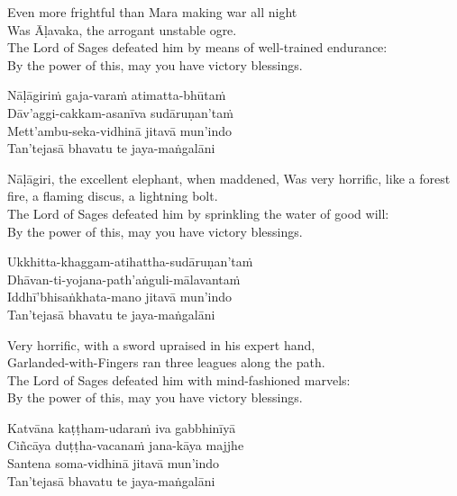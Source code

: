 \begin{english-verses}
  Even more frightful than Mara making war all night\\
  Was Āḷavaka, the arrogant unstable ogre.\\
  The Lord of Sages defeated him by means of well-trained endurance:\\
  By the power of this, may you have victory blessings.
\end{english-verses}

\begin{pali-hang-continued}
  Nāḷāgiriṁ gaja-varaṁ atimatta-bhūtaṁ\\
  Dāv'aggi-cakkam-asanīva sudāruṇan'taṁ\\
  Mett'ambu-seka-vidhinā jitavā mun'indo\\
  Tan'tejasā bhavatu te jaya-maṅgalāni\\
\end{pali-hang-continued}

\begin{english-verses}
  Nāḷāgiri, the excellent elephant, when maddened,
  Was very horrific, like a forest fire, a flaming discus, a lightning bolt.\\
  The Lord of Sages defeated him by sprinkling the water of good will:\\
  By the power of this, may you have victory blessings.
\end{english-verses}

\begin{pali-hang-continued}
  Ukkhitta-khaggam-atihattha-sudāruṇan'taṁ\\
  Dhāvan-ti-yojana-path'aṅguli-mālavantaṁ\\
  Iddhī'bhisaṅkhata-mano jitavā mun'indo\\
  Tan'tejasā bhavatu te jaya-maṅgalāni
\end{pali-hang-continued}

\begin{english-verses}
  Very horrific, with a sword upraised in his expert hand,\\
  Garlanded-with-Fingers ran three leagues along the path.\\
  The Lord of Sages defeated him with mind-fashioned marvels:\\
  By the power of this, may you have victory blessings.
\end{english-verses}

\begin{pali-hang-continued}
  Katvāna kaṭṭham-udaraṁ iva gabbhinīyā\\
  Ciñcāya duṭṭha-vacanaṁ jana-kāya majjhe\\
  Santena soma-vidhinā jitavā mun'indo\\
  Tan'tejasā bhavatu te jaya-maṅgalāni
\end{pali-hang-continued}

